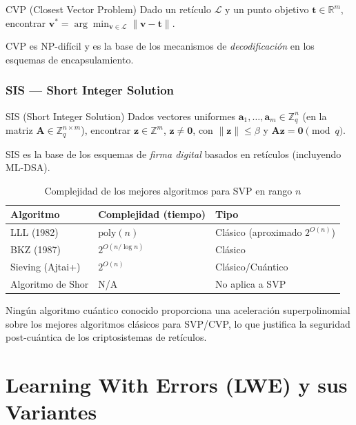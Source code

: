 \documentclass[12pt,a4paper,twoside,openright]{book}
\theoremstyle{plain}
\theoremstyle{definition}
\theoremstyle{remark}
\newcommand{\Z}{\mathbb{Z}}
\newcommand{\Zq}{\mathbb{Z}_q}
\newcommand{\R}{\mathbb{R}}
\newcommand{\vv}[1]{\mathbf{#1}}
\newcommand{\mm}[1]{\mathbf{#1}}
\begin{document}
\begin{midef}{CVP (Closest Vector Problem)}
  Dado un ret\'iculo $\mathcal{L}$ y un punto objetivo $\vv{t} \in \R^m$,
  encontrar $\vv{v}^* = \arg\min_{\vv{v}\in\mathcal{L}} \|\vv{v} - \vv{t}\|$.
\end{midef}

CVP es NP-dif\'icil y es la base de los mecanismos de \emph{decodificaci\'on}
en los esquemas de encapsulamiento.

\subsection{SIS --- Short Integer Solution}

\begin{midef}{SIS (Short Integer Solution)}
  Dados vectores uniformes $\vv{a}_1,\ldots,\vv{a}_m \in \Zq^n$
  (en la matriz $\mm{A} \in \Zq^{n\times m}$), encontrar
  $\vv{z} \in \Z^m$, $\vv{z}\neq\vv{0}$, con $\|\vv{z}\| \leq \beta$ y
  $\mm{A}\vv{z} = \vv{0} \pmod{q}$.
\end{midef}

SIS es la base de los esquemas de \emph{firma digital} basados en ret\'iculos
(incluyendo ML-DSA).

\begin{table}[H]
\centering
\caption{Complejidad de los mejores algoritmos para SVP en rango $n$}
\label{tab:complejidad_svp}
\begin{tabular}{lll}
\toprule
\textbf{Algoritmo} & \textbf{Complejidad (tiempo)} & \textbf{Tipo} \\
\midrule
LLL (1982) & $\mathrm{poly}(n)$ & Cl\'asico (aproximado $2^{O(n)}$) \\
BKZ (1987) & $2^{O(n/\log n)}$ & Cl\'asico \\
Sieving (Ajtai+) & $2^{O(n)}$ & Cl\'asico/Cu\'antico \\
Algoritmo de Shor & N/A & No aplica a SVP \\
\bottomrule
\end{tabular}
\end{table}

Ning\'un algoritmo cu\'antico conocido proporciona una aceleraci\'on
superpolinomial sobre los mejores algoritmos cl\'asicos para SVP/CVP, lo
que justifica la seguridad post-cu\'antica de los criptosistemas de ret\'iculos.

\chapter{Learning With Errors (LWE) y sus Variantes}
\label{chap:lwe}
\end{document}

